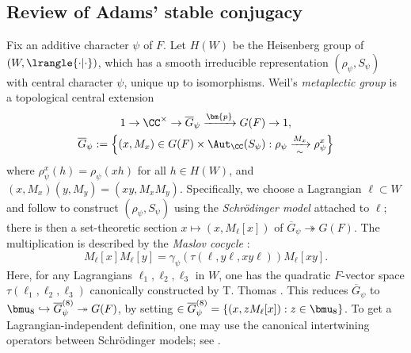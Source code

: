 \documentclass[a4paper,10pt]{article}
\begin{document}
\subsection{Review of Adams' stable conjugacy}\label{sec:Adams}
Fix an additive character $\psi$ of $F$. Let $H(W)$ be the Heisenberg group of $(W, \lrangle{\cdot|\cdot})$, which has a smooth irreducible representation $(\rho_\psi, S_\psi)$ with central character $\psi$, unique up to isomorphisms. Weil's \emph{metaplectic group} is a topological central extension
\begin{gather*}
	1 \to \CC^\times \to \overline{G}_\psi \xrightarrow{\bm{p}} G(F) \to 1, \\
	\overline{G}_\psi := \left\{ (x, M_x) \in G(F) \times \Aut_{\CC}(S_\psi) : \rho_\psi \xrightarrow[\sim]{M_x} \rho_\psi^x \right\}
\end{gather*}
where $\rho_\psi^x(h) = \rho_\psi(xh)$ for all $h \in H(W)$, and $(x, M_x)(y, M_y) = (xy, M_x M_y)$. Specifically, we choose a Lagrangian $\ell \subset W$ and follow \cite[\S 2.4.1]{Li11} to construct $(\rho_\psi, S_\psi)$ using the \emph{Schrödinger model} attached to $\ell$; there is then a set-theoretic section $x \mapsto (x, M_\ell[x])$ of $\overline{G}_\psi \twoheadrightarrow G(F)$. The multiplication is described by the \emph{Maslov cocycle} \cite[Théorème 2.6]{Li11}:
\begin{equation}\label{eqn:Maslov-cocycle}
	M_\ell[x] M_\ell[y] = \gamma_\psi\left( \tau(\ell, y\ell, xy\ell) \right) M_\ell[xy].
\end{equation}
Here, for any Lagrangians $\ell_1, \ell_2, \ell_3$ in $W$, one has the quadratic $F$-vector space $\tau(\ell_1, \ell_2, \ell_3)$ canonically constructed by T.\! Thomas \cite{Th06}. This reduces $\overline{G}_\psi$ to $\bmu_8 \hookrightarrow \overline{G}_\psi^{(8)} \twoheadrightarrow G(F)$, by setting $\in \overline{G}_\psi^{(8)} = \{(x, zM_\ell[x]): z \in \bmu_8 \}$. To get a Lagrangian-independent definition, one may use the canonical intertwining operators between Schrödinger models; see \cite[\S 2.1]{Per81}. 
\end{document}
